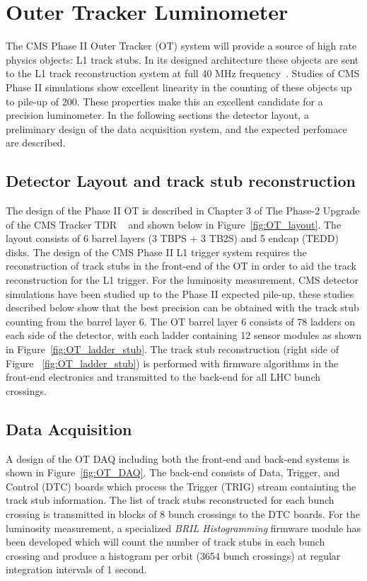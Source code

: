 \chapter{Outer Tracker Luminometer}

The CMS Phase II Outer Tracker  (OT) system will provide a source of high rate physics objects: L1 track stubs.
In its designed architecture these objects are sent to the L1 track reconstruction system at full 40 MHz frequency~\cite{CERN-LHCC-2017-009}.
Studies of CMS Phase II simulations show excellent linearity in the counting of these objects up to pile-up of 200.
These properties make this an excellent candidate for a precision luminometer.
In the following sections the detector layout, a preliminary design of the data acquisition system, and the expected perfomace are described.


\section{Detector Layout and track stub reconstruction}

The design of the Phase II OT is described in Chapter 3 of The Phase-2 Upgrade of the CMS Tracker TDR ~\cite{CERN-LHCC-2017-009} and shown below in Figure~\ref{fig:OT_layout}.
The layout consists of 6 barrel layers (3 TBPS + 3 TB2S) and 5 endcap (TEDD) disks.
The design of the CMS Phase II L1 trigger system requires the reconstruction of track stubs in the front-end of the OT in order to aid the track reconstruction for the L1 trigger.
For the luminosity measurement, CMS detector simulations have been studied up to the Phase II expected pile-up,
these studies described below show that the best precision can be obtained with the track stub counting from the barrel layer 6. 
The OT barrel layer 6 consists of 78 ladders on each side of the detector, with each ladder containing 12 sensor modules as shown in Figure~\ref{fig:OT_ladder_stub}.
The track stub reconstruction (right side of Figure ~\ref{fig:OT_ladder_stub}) is performed with firmware algorithms in the front-end electronics and transmitted to the back-end for all LHC bunch crossings.


\section{Data Acquisition}

A design of the OT DAQ including both the front-end and back-end systems is shown in Figure~\ref{fig:OT_DAQ}.
The back-end consists of Data, Trigger, and Control (DTC) boards which process the Trigger (TRIG) stream containting the track stub information. 
The list of track stubs reconstructed for each bunch crossing is transmitted in blocks of 8 bunch crossings to the DTC boards.
For the luminosity measurement, a specialized {\it BRIL Histogramming} firmware module has been developed which will count the number of track stubs in each bunch crossing and produce a histogram per orbit (3654 bunch crossings) at regular integration intervals of 1 second.

